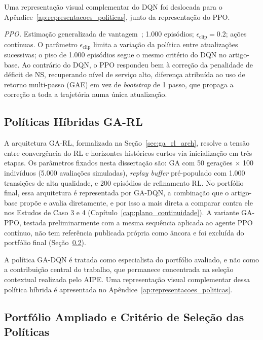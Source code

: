 Uma representação visual complementar do DQN foi deslocada para o Apêndice~\ref{ap:representacoes_politicas}, junto da representação do PPO.

\textit{PPO.} Estimação generalizada de vantagem~\citep{Schulman2016GAE}; 1.000 episódios; $\epsilon_{\text{clip}}=0.2$; ações contínuas. O parâmetro $\epsilon_{\text{clip}}$ limita a variação da política entre atualizações sucessivas; o piso de 1.000 episódios segue o mesmo critério do DQN no artigo-base. Ao contrário do DQN, o PPO respondeu bem à correção da penalidade de déficit de NS, recuperando nível de serviço alto, diferença atribuída ao uso de retorno multi-passo (GAE) em vez de \textit{bootstrap} de 1 passo, que propaga a correção a toda a trajetória numa única atualização.

\subsection{Políticas Híbridas GA-RL}

A arquitetura GA-RL, formalizada na Seção~\ref{sec:ga_rl_arch}, resolve a tensão entre convergência do RL e horizontes históricos curtos via inicialização em três etapas. Os parâmetros fixados nesta dissertação são: GA com 50 gerações $\times$ 100 indivíduos (5.000 avaliações simuladas), \textit{replay buffer} pré-populado com 1.000 transições de alta qualidade, e 200 episódios de refinamento RL. No portfólio final, essa arquitetura é representada por GA-DQN, a combinação que o artigo-base \citep{Zabraoui2025GaDQN} propõe e avalia diretamente, e por isso a mais direta a comparar contra ele nos Estudos de Caso 3 e 4 (Capítulo~\ref{cap:plano_continuidade}). A variante GA-PPO, testada preliminarmente com a mesma sequência aplicada ao agente PPO contínuo, não tem referência publicada própria como âncora e foi excluída do portfólio final (Seção~\ref{sec:portfolio_ampliado}).

A política GA-DQN é tratada como especialista do portfólio avaliado, e não como a contribuição central do trabalho, que permanece concentrada na seleção contextual realizada pelo AIPE. Uma representação visual complementar dessa política híbrida é apresentada no Apêndice~\ref{ap:representacoes_politicas}.

\subsection{Portfólio Ampliado e Critério de Seleção das Políticas}
\label{sec:portfolio_ampliado}

